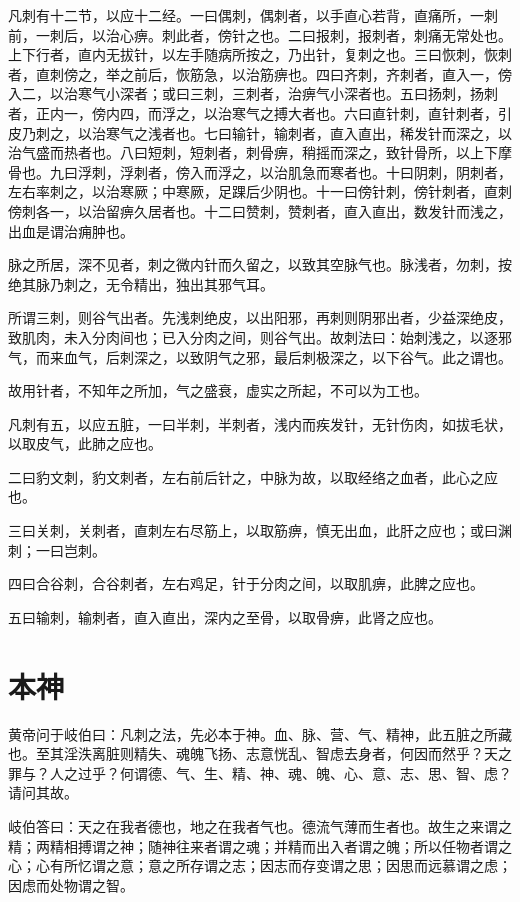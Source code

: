 \documentclass[a4paper,12pt,UTF8,twoside]{ctexbook}
\begin{document}
	凡刺有十二节，以应十二经。一曰偶刺，偶刺者，以手直心若背，直痛所，一刺前，一刺后，以治心痹。刺此者，傍针之也。二曰报刺，报刺者，刺痛无常处也。上下行者，直内无拔针，以左手随病所按之，乃出针，复刺之也。三曰恢刺，恢刺者，直刺傍之，举之前后，恢筋急，以治筋痹也。四曰齐刺，齐刺者，直入一，傍入二，以治寒气小深者；或曰三刺，三刺者，治痹气小深者也。五曰扬刺，扬刺者，正内一，傍内四，而浮之，以治寒气之搏大者也。六曰直针刺，直针刺者，引皮乃刺之，以治寒气之浅者也。七曰输针，输刺者，直入直出，稀发针而深之，以治气盛而热者也。八曰短刺，短刺者，刺骨痹，稍摇而深之，致针骨所，以上下摩骨也。九曰浮刺，浮刺者，傍入而浮之，以治肌急而寒者也。十曰阴刺，阴刺者，左右率刺之，以治寒厥；中寒厥，足踝后少阴也。十一曰傍针刺，傍针刺者，直刺傍刺各一，以治留痹久居者也。十二曰赞刺，赞刺者，直入直出，数发针而浅之，出血是谓治痈肿也。
	
	脉之所居，深不见者，刺之微内针而久留之，以致其空脉气也。脉浅者，勿刺，按绝其脉乃刺之，无令精出，独出其邪气耳。
	
	所谓三刺，则谷气出者。先浅刺绝皮，以出阳邪，再刺则阴邪出者，少益深绝皮，致肌肉，未入分肉间也；已入分肉之间，则谷气出。故刺法曰：始刺浅之，以逐邪气，而来血气，后刺深之，以致阴气之邪，最后刺极深之，以下谷气。此之谓也。
	
	故用针者，不知年之所加，气之盛衰，虚实之所起，不可以为工也。
	
	凡刺有五，以应五脏，一曰半刺，半刺者，浅内而疾发针，无针伤肉，如拔毛状，以取皮气，此肺之应也。
	
	二曰豹文刺，豹文刺者，左右前后针之，中脉为故，以取经络之血者，此心之应也。
	
	三曰关刺，关刺者，直刺左右尽筋上，以取筋痹，慎无出血，此肝之应也；或曰渊刺；一曰岂刺。
	
	四曰合谷刺，合谷刺者，左右鸡足，针于分肉之间，以取肌痹，此脾之应也。
	
	五曰输刺，输刺者，直入直出，深内之至骨，以取骨痹，此肾之应也。
	
	\chapter{本神}
	
	黄帝问于岐伯曰：凡刺之法，先必本于神。血、脉、营、气、精神，此五脏之所藏也。至其淫泆离脏则精失、魂魄飞扬、志意恍乱、智虑去身者，何因而然乎？天之罪与？人之过乎？何谓德、气、生、精、神、魂、魄、心、意、志、思、智、虑？请问其故。
	
	岐伯答曰：天之在我者德也，地之在我者气也。德流气薄而生者也。故生之来谓之精；两精相搏谓之神；随神往来者谓之魂；并精而出入者谓之魄；所以任物者谓之心；心有所忆谓之意；意之所存谓之志；因志而存变谓之思；因思而远慕谓之虑；因虑而处物谓之智。
	
\end{document}
